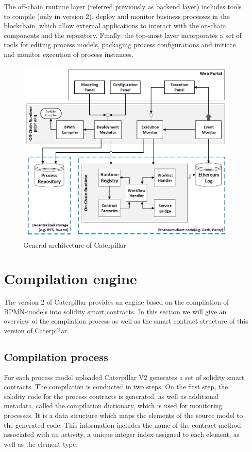 The off-chain runtime layer (referred previously as backend layer) includes tools to compile (only in version 2), deploy and monitor business processes in the blockchain, which allow external applications to interact with the on-chain components and the repository. Finally, the top-most layer incorporates a set of tools for editing process models, packaging process configurations and initiate and monitor execution of process instances.

\begin{figure}[hbt]
	\includegraphics[width=\textwidth]{gfx/caterpillar-architecture}
	\caption{General architecture of Caterpillar}
	\label{fig:caterpillar:overview:architecture}
\end{figure}

\section{Compilation engine}
\label{sec:caterpillar:v2}

The version 2 of Caterpillar provides an engine based on the compilation of BPMN-models into solidity smart contracts. In this section we will give an overview of the compilation process as well as the smart contract structure of this version of Caterpillar.

\subsection{Compilation process}
\label{sec:caterpillar:v2:compilation}
For each process model uploaded Caterpillar V2 generates a set of solidity smart contracts. The compilation is conducted in two steps. On the first step, the solidity code for the process contracts is generated, as well as additional metadata, called the compilation dictionary, which is used for monitoring processes. It is a data structure which maps the elements of the source model to the generated code. This information includes the name of the contract method associated with an activity, a unique integer index assigned to each element, as well as the element type.\\

